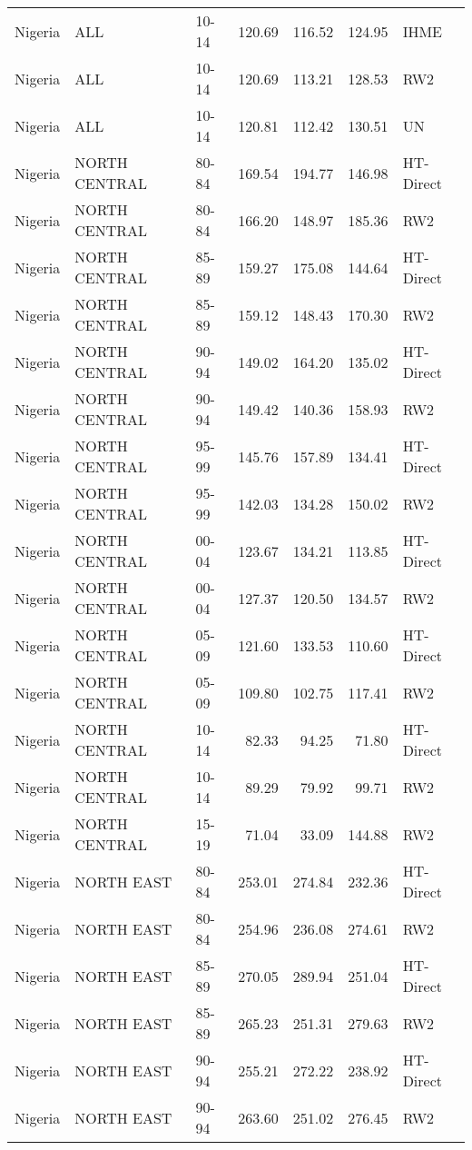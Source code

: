 \begin{longtable}{lllrrrl}
  Nigeria & ALL & 10-14 & 120.69 & 116.52 & 124.95 & IHME \\ 
  Nigeria & ALL & 10-14 & 120.69 & 113.21 & 128.53 & RW2 \\ 
  Nigeria & ALL & 10-14 & 120.81 & 112.42 & 130.51 & UN \\ 
  Nigeria & NORTH CENTRAL & 80-84 & 169.54 & 194.77 & 146.98 & HT-Direct \\ 
  Nigeria & NORTH CENTRAL & 80-84 & 166.20 & 148.97 & 185.36 & RW2 \\ 
  Nigeria & NORTH CENTRAL & 85-89 & 159.27 & 175.08 & 144.64 & HT-Direct \\ 
  Nigeria & NORTH CENTRAL & 85-89 & 159.12 & 148.43 & 170.30 & RW2 \\ 
  Nigeria & NORTH CENTRAL & 90-94 & 149.02 & 164.20 & 135.02 & HT-Direct \\ 
  Nigeria & NORTH CENTRAL & 90-94 & 149.42 & 140.36 & 158.93 & RW2 \\ 
  Nigeria & NORTH CENTRAL & 95-99 & 145.76 & 157.89 & 134.41 & HT-Direct \\ 
  Nigeria & NORTH CENTRAL & 95-99 & 142.03 & 134.28 & 150.02 & RW2 \\ 
  Nigeria & NORTH CENTRAL & 00-04 & 123.67 & 134.21 & 113.85 & HT-Direct \\ 
  Nigeria & NORTH CENTRAL & 00-04 & 127.37 & 120.50 & 134.57 & RW2 \\ 
  Nigeria & NORTH CENTRAL & 05-09 & 121.60 & 133.53 & 110.60 & HT-Direct \\ 
  Nigeria & NORTH CENTRAL & 05-09 & 109.80 & 102.75 & 117.41 & RW2 \\ 
  Nigeria & NORTH CENTRAL & 10-14 & 82.33 & 94.25 & 71.80 & HT-Direct \\ 
  Nigeria & NORTH CENTRAL & 10-14 & 89.29 & 79.92 & 99.71 & RW2 \\ 
  Nigeria & NORTH CENTRAL & 15-19 & 71.04 & 33.09 & 144.88 & RW2 \\ 
  Nigeria & NORTH EAST & 80-84 & 253.01 & 274.84 & 232.36 & HT-Direct \\ 
  Nigeria & NORTH EAST & 80-84 & 254.96 & 236.08 & 274.61 & RW2 \\ 
  Nigeria & NORTH EAST & 85-89 & 270.05 & 289.94 & 251.04 & HT-Direct \\ 
  Nigeria & NORTH EAST & 85-89 & 265.23 & 251.31 & 279.63 & RW2 \\ 
  Nigeria & NORTH EAST & 90-94 & 255.21 & 272.22 & 238.92 & HT-Direct \\ 
  Nigeria & NORTH EAST & 90-94 & 263.60 & 251.02 & 276.45 & RW2 \\ 

\end{longtable}
